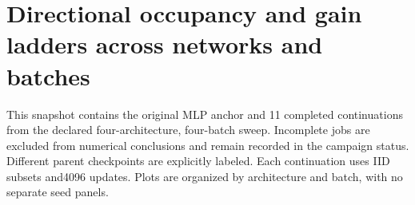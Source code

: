 \documentclass[10pt]{article}
\begin{document}
\section*{Directional occupancy and gain ladders across networks and batches}
This snapshot contains the original MLP anchor and 11 completed continuations from the declared four-architecture, four-batch sweep. Incomplete jobs are excluded from numerical conclusions and remain recorded in the campaign status. Different parent checkpoints are explicitly labeled. Each continuation uses IID subsets and4096 updates. Plots are organized by architecture and batch, with no separate seed panels.

\end{document}
